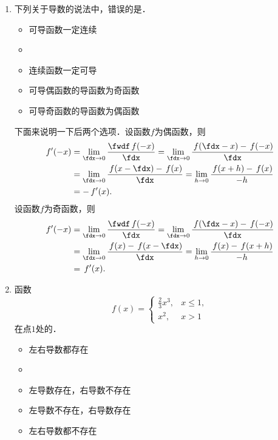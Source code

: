 \begin{enumerate}
\item 下列关于导数的说法中，错误的是\uline{\hspace{10em}}．
  \begin{itemize}
    \renewcommand{\labelitemi}{\faCircleThin}
  \item 可导函数一定连续
    \ifshowsol
  \item[\faCircle]
    \else
  \item
    \fi
    连续函数一定可导
  \item 可导偶函数的导函数为奇函数
  \item 可导奇函数的导函数为偶函数
  \end{itemize}

  \ifshowsol
  下面来说明一下后两个选项．设函数\(f\)为偶函数，则
  \begin{equation*}
    \begin{split}
      f'(-x)
      &= \lim_{\fdx \to 0} \frac{\fwdf\,f(-x)}{\fdx}
      = \lim_{\fdx \to 0} \frac{\,f(\fdx-x) - \,f(-x)}{\fdx} \\
      &= \lim_{\fdx \to 0} \frac{\,f(x-\fdx) - \,f(x)}{\fdx}
      = \lim_{h \to 0} \frac{\,f(x+h) - \,f(x)}{-h} \\
      &= - \,f'(x).
    \end{split}
  \end{equation*}
  设函数\(f\)为奇函数，则
  \begin{equation*}
    \begin{split}
      f'(-x)
      &= \lim_{\fdx \to 0} \frac{\fwdf\,f(-x)}{\fdx}
      = \lim_{\fdx \to 0} \frac{\,f(\fdx-x) - \,f(-x)}{\fdx} \\
      &= \lim_{\fdx \to 0} \frac{\,f(x) - \,f(x-\fdx)}{\fdx}
      = \lim_{h \to 0} \frac{\,f(x) - \,f(x+h)}{-h} \\
      &= \,f'(x).
    \end{split}
  \end{equation*}
  \fi

\item 函数
  \begin{equation*}
    f(x) =
    \begin{cases}
      \frac23 x^3, & x \le 1, \\
      x^2, & x > 1
    \end{cases}
  \end{equation*}
  在点\(1\)处的\uline{\hspace{10em}}．
  \begin{itemize}
    \renewcommand{\labelitemi}{\faCircleThin}
  \item 左右导数都存在
    \ifshowsol
  \item[\faCircle]
    \else
  \item
    \fi
    左导数存在，右导数不存在
  \item 左导数不存在，右导数存在
  \item 左右导数都不存在
  \end{itemize}


\end{enumerate}
